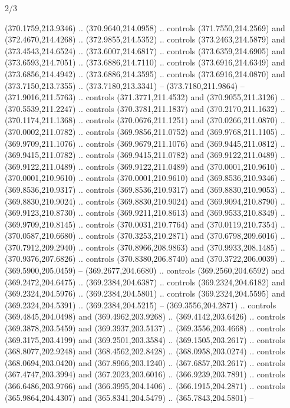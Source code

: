 \begin{flagdescription}{2/3}
\begin{scope}[xshift=0.5\flaglength,yshift=0.5\flagwidth,scale=\flagwidth/495.65]
\begin{scope}[y=0.8pt, x=0.8pt, yscale=-1,shift={(-463.76,-309.78)}]
  (370.1759,213.9346) .. (370.9640,214.0958) .. controls (371.7550,214.2569) and
  (372.4670,214.4268) .. (372.9855,214.5352) .. controls (373.2463,214.5879) and
  (373.4543,214.6524) .. (373.6007,214.6817) .. controls (373.6359,214.6905) and
  (373.6593,214.7051) .. (373.6886,214.7110) .. controls (373.6916,214.6349) and
  (373.6856,214.4942) .. (373.6886,214.3595) .. controls (373.6916,214.0870) and
  (373.7150,213.7355) .. (373.7180,213.3341) -- (373.7180,211.9864) --
  (371.9016,211.5763) .. controls (371.3771,211.4532) and (370.9055,211.3126) ..
  (370.5539,211.2247) .. controls (370.3781,211.1837) and (370.2170,211.1632) ..
  (370.1174,211.1368) .. controls (370.0676,211.1251) and (370.0266,211.0870) ..
  (370.0002,211.0782) .. controls (369.9856,211.0752) and (369.9768,211.1105) ..
  (369.9709,211.1076) .. controls (369.9679,211.1076) and (369.9445,211.0812) ..
  (369.9415,211.0782) .. controls (369.9415,211.0782) and (369.9122,211.0489) ..
  (369.9122,211.0489) .. controls (369.9122,211.0489) and (370.0001,210.9610) ..
  (370.0001,210.9610) .. controls (370.0001,210.9610) and (369.8536,210.9346) ..
  (369.8536,210.9317) .. controls (369.8536,210.9317) and (369.8830,210.9053) ..
  (369.8830,210.9024) .. controls (369.8830,210.9024) and (369.9094,210.8790) ..
  (369.9123,210.8730) .. controls (369.9211,210.8613) and (369.9533,210.8349) ..
  (369.9709,210.8145) .. controls (370.0031,210.7764) and (370.0119,210.7354) ..
  (370.0587,210.6680) .. controls (370.3253,210.2871) and (370.6798,209.6016) ..
  (370.7912,209.2940) .. controls (370.8966,208.9863) and (370.9933,208.1485) ..
  (370.9376,207.6826) .. controls (370.8380,206.8740) and (370.3722,206.0039) ..
  (369.5900,205.0459) -- (369.2677,204.6680) .. controls (369.2560,204.6592) and
  (369.2472,204.6475) .. (369.2384,204.6387) .. controls (369.2324,204.6182) and
  (369.2324,204.5976) .. (369.2384,204.5801) .. controls (369.2324,204.5595) and
  (369.2324,204.5391) .. (369.2384,204.5215) -- (369.3556,204.2871) .. controls
  (369.4845,204.0498) and (369.4962,203.9268) .. (369.4142,203.6426) .. controls
  (369.3878,203.5459) and (369.3937,203.5137) .. (369.3556,203.4668) .. controls
  (369.3175,203.4199) and (369.2501,203.3584) .. (369.1505,203.2617) .. controls
  (368.8077,202.9248) and (368.4562,202.8428) .. (368.0958,203.0274) .. controls
  (368.0694,203.0420) and (367.8966,203.1240) .. (367.6857,203.2617) .. controls
  (367.4747,203.3994) and (367.2023,203.6016) .. (366.9239,203.7891) .. controls
  (366.6486,203.9766) and (366.3995,204.1406) .. (366.1915,204.2871) .. controls
  (365.9864,204.4307) and (365.8341,204.5479) .. (365.7843,204.5801) --

\end{scope}
\end{scope}
\end{flagdescription}

